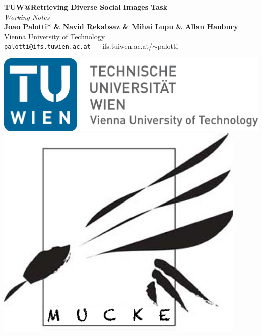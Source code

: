 \documentclass[a0,portrait]{a0poster}
\begin{document}


\begin{minipage}[b]{0.75\linewidth}
\veryHuge \color{NavyBlue} \textbf{TUW@Retrieving Diverse Social Images Task} \color{Black}\\ %
{\color{MediumAquamarine}
\Huge\textit{Working Notes}\\[2cm] %
}
\huge \textbf{Joao Palotti* \& Navid Rekabsaz \& Mihai Lupu \& Allan Hanbury}\\[0.5cm] %
\huge Vienna University of Technology\\[0.4cm] %
\Large \texttt{palotti@ifs.tuwien.ac.at} --- \color{NavyBlue} ifs.tuiwen.ac.at/$\sim$palotti \color{Black} \\
\end{minipage}
%
\begin{minipage}[b]{0.25\linewidth}
\includegraphics[width=20cm]{TU2.png}\\
\hspace{50cm} \includegraphics[width=12cm]{mucke.png}\\
\end{minipage}
\end{document}
